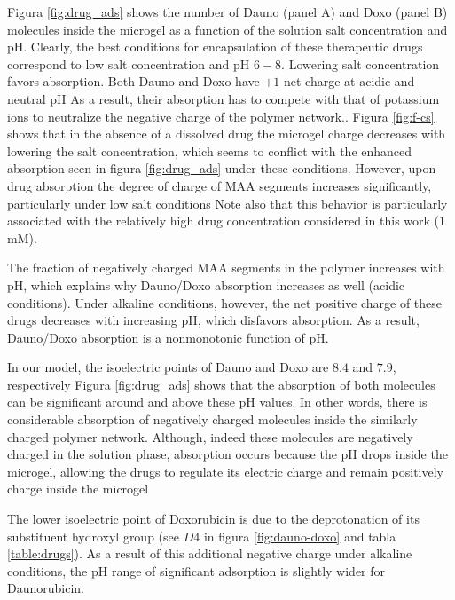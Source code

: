 Figura \ref{fig:drug_ads} shows the number of Dauno (panel A) and Doxo (panel B) molecules inside the microgel as a function of the solution salt concentration and pH.
Clearly, the best conditions for encapsulation of these therapeutic drugs correspond to low salt concentration and pH $6-8$.
Lowering salt concentration favors absorption.
Both Dauno and Doxo have $+1$ net charge at acidic and neutral pH %
As a result, their absorption has to compete with that of potassium ions to neutralize the negative charge of the polymer network.\addcite[PerezChavez2020].
Figura \ref{fig:f-cs} shows that in the absence of a dissolved drug the microgel charge decreases with lowering the salt concentration, which seems to conflict with the enhanced absorption seen in figura \ref{fig:drug_ads} under these conditions.
However, upon drug absorption the degree of charge of MAA segments increases significantly, particularly under low salt conditions %
Note also that this behavior is particularly associated with the relatively high drug concentration considered in this work ($1\,$mM).

The fraction of negatively charged MAA segments in the polymer increases with pH, which explains why Dauno/Doxo absorption increases as well (acidic conditions).
Under alkaline conditions, however, the net positive charge of these drugs decreases with increasing pH, which disfavors absorption.
As a result, Dauno/Doxo absorption is a nonmonotonic function of pH.



In our model, the isoelectric points of Dauno and Doxo are $8.4$ and $7.9$, respectively%
Figura \ref{fig:drug_ads} shows that the absorption of both molecules can be significant around and above these pH values.
In other words, there is considerable absorption of negatively charged molecules inside the similarly charged polymer network.
Although, indeed these molecules are negatively charged in the solution phase, absorption occurs because the pH drops inside the microgel, allowing the drugs to regulate its electric charge and remain positively charge inside the microgel %


The lower isoelectric point of Doxorubicin is due to the deprotonation of its substituent hydroxyl group (see $D4$ in figura \ref{fig:dauno-doxo} and tabla \ref{table:drugs}).
As a result of this additional negative charge under alkaline conditions, the pH range of significant adsorption is slightly wider for Daunorubicin.
